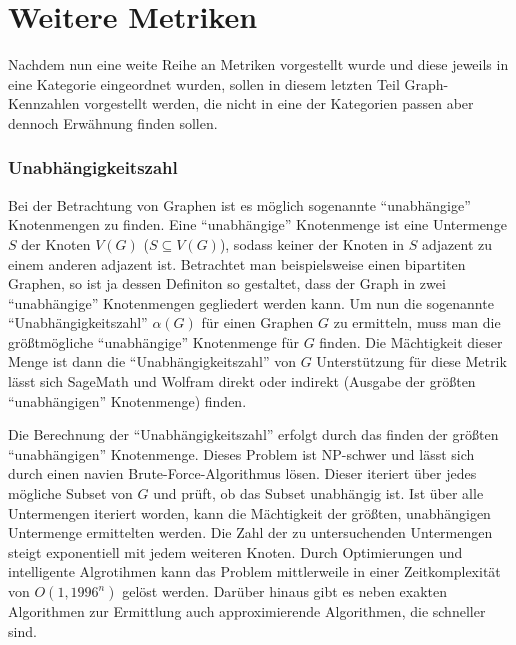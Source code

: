\documentclass[a4paper,12pt,ngerman,chapterprefix=false,listof=totoc,bibliography=totoc]{scrreprt}
\begin{document}
\section{Weitere Metriken}
{
Nachdem nun eine weite Reihe an Metriken vorgestellt wurde und diese jeweils in eine Kategorie eingeordnet wurden, sollen in diesem letzten Teil Graph-Kennzahlen vorgestellt werden, die nicht in eine der Kategorien passen aber dennoch Erwähnung finden sollen.
\subsubsection*{Unabhängigkeitszahl}
{
Bei der Betrachtung von Graphen ist es möglich sogenannte "`unabhängige"' Knotenmengen zu finden. Eine "`unabhängige"' Knotenmenge ist eine Untermenge \(S\) der Knoten \(V(G)\) (\(S\subseteq V(G)\)), sodass keiner der Knoten in \(S\) adjazent zu einem anderen adjazent ist. Betrachtet man beispielsweise einen bipartiten Graphen, so ist ja dessen Definiton so gestaltet, dass der Graph in zwei "`unabhängige"' Knotenmengen gegliedert werden kann. Um nun die sogenannte "`Unabhängigkeitszahl"' \(\alpha(G)\) für einen Graphen \(G\) zu ermitteln, muss man die größtmögliche "`unabhängige"' Knotenmenge für \(G\) finden. Die Mächtigkeit dieser Menge ist dann die "`Unabhängigkeitszahl"' von \(G\) \cite{diestel_graphentheorie_2000,weisstein_maximum_nodate,weisstein_maximum_nodate} Unterstützung für diese Metrik lässt sich SageMath und Wolfram direkt oder indirekt (Ausgabe der größten "`unabhängigen"' Knotenmenge) finden. \cite{sagemath_graph_2020,weisstein_independence_nodate}

Die Berechnung der "`Unabhängigkeitszahl"' erfolgt durch das finden der größten "`unabhängigen"' Knotenmenge. Dieses Problem ist NP-schwer und lässt sich durch einen navien Brute-Force-Algorithmus lösen. Dieser iteriert über jedes mögliche Subset von \(G\) und prüft, ob das Subset unabhängig ist. Ist über alle Untermengen iteriert worden, kann die Mächtigkeit der größten, unabhängigen Untermenge ermittelten werden. Die Zahl der zu untersuchenden Untermengen steigt exponentiell mit jedem weiteren Knoten. Durch Optimierungen und intelligente Algrotihmen kann das Problem mittlerweile in einer Zeitkomplexität von \(O(1,1996^n)\) gelöst werden. Darüber hinaus gibt es neben exakten Algorithmen zur Ermittlung auch approximierende Algorithmen, die schneller sind. \cite{xiao_exact_2017}
}
}
\end{document}
